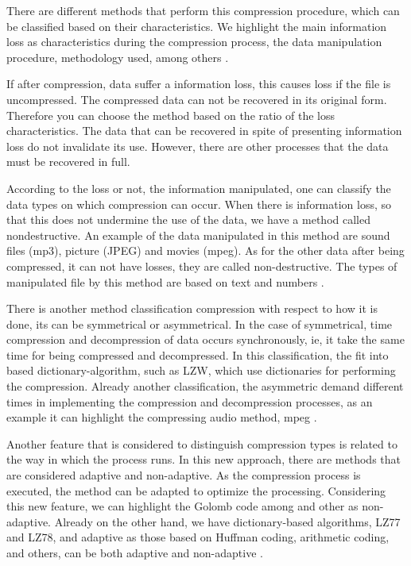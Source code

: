 \documentclass[10pt]{article}
\begin{document}
There are different methods that perform this compression procedure, which can be classified based on their characteristics. We highlight the main information loss as characteristics during the compression process, the data manipulation procedure, methodology used, among others \cite{salomon2}.

If after compression, data suffer a information loss, this causes loss if the file is uncompressed. The compressed data can not be recovered in its original form. Therefore you can choose the method based on the ratio of the loss characteristics. The data that can be recovered in spite of presenting information loss do not invalidate its use. However, there are other processes that the data must be recovered in full.

According to the loss or not, the information manipulated, one can classify the data types on which compression can occur. When there is information loss, so that this does not undermine the use of the data, we have a method called nondestructive. An example of the data manipulated in this method are sound files (mp3), picture (JPEG) and movies (mpeg). As for the other data after being compressed, it can not have losses, they are called non-destructive. The types of manipulated file by this method are based on text and numbers \cite{salomon,salomon2}.

There is another method classification compression with respect to how it is done, its can be symmetrical or asymmetrical. In the case of symmetrical, time compression and decompression of data occurs synchronously, ie, it take the same time for being compressed and decompressed. In this classification, the fit into based dictionary-algorithm, such as LZW, which use dictionaries for performing the compression. Already another classification, the asymmetric demand different times in implementing the compression and decompression processes, as an example it can highlight the compressing audio method, mpeg \cite{salomon,salomon2}.

Another feature that is considered to distinguish compression types is related to the way in which the process runs. In this new approach, there are methods that are considered adaptive and non-adaptive. As the compression process is executed, the method can be adapted to optimize the processing. Considering this new feature, we can highlight the Golomb code among and other as non-adaptive. Already on the other hand, we have dictionary-based algorithms, LZ77 and LZ78, and adaptive as those based on Huffman coding, arithmetic coding, and others, can be both adaptive and non-adaptive \cite{salomon, salomon2}.
\end{document}
